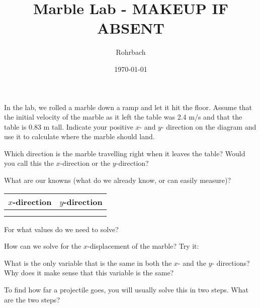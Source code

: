 \documentclass[10pt]{exam}
\title{Marble Lab - MAKEUP IF ABSENT}
\author{Rohrbach}
\date{\today}
\begin{document}
\maketitle

\begin{questions}
  	
  \question
    In the lab, we rolled a marble down a ramp and let it hit the floor.  Assume that the initial velocity of the marble as it left the table was 2.4 m/s and that the table is 0.83 m tall.  Indicate your positive $x$- and $y$- direction on the diagram and use it to calculate where the marble should land.  
    
  
  \question
    Which direction is the marble travelling right when it leaves the table?  Would you call this the $x$-direction or the $y$-direction?
    \vspace{3em}
  
  \question
    What are our knowns (what do we already know, or can easily measure)?

    \begin{center}
      \begin{tabular}{c|c}
        $x$-direction & $y$-direction \\
        \hline \\
        \\[5em]
      \end{tabular}
    \end{center}
  
  \question
    For what values do we need to solve?
    \vspace{3em}
  
  \question
    How can we solve for the $x$-displacement of the marble?  Try it:

  \pagebreak
  
  
  
  \question
    What is the only variable that is the same in both the $x$- and the $y$- directions?  Why does it make sense that this variable is the same?
    \vs
  
  \question
    To find how far a projectile goes, you will usually solve this in two steps.  What are the two steps?
    \vs
\end{questions}
\end{document}

